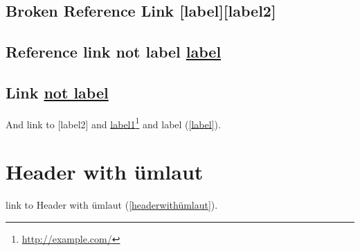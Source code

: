 \section{Broken Reference Link [label][label2]}
\label{brokenreferencelinklabellabel2}

\section{Reference link not label \href{http://example.com/}{label}}
\label{referencelinknotlabellabellabel1}

\section{Link \href{http://example.net/}{not label}}
\label{linknotlabel}

And link to [label2] and \href{http://example.com/}{label1}\footnote{\href{http://example.com/}{http:/\slash example.com\slash }} and label (\autoref{label}).

\chapter{Header with ümlaut}
\label{headerwithümlaut}

link to Header with ümlaut (\autoref{headerwithümlaut}).




